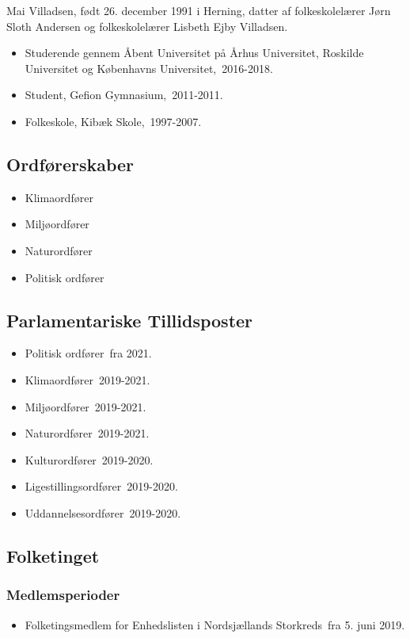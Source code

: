 \documentclass[11pt, a4paper]{awesome-cv}
\begin{document}
\makecvheader[R]
\makelettertitle
\begin{cvletter}
Mai Villadsen, født 26. december 1991 i Herning, datter af folkeskolelærer Jørn Sloth Andersen og folkeskolelærer Lisbeth Ejby Villadsen.

\begin{itemize}
\item Studerende gennem Åbent Universitet på Århus Universitet, Roskilde Universitet og Københavns Universitet, 2016-2018.
\item Student, Gefion Gymnasium, 2011-2011.
\item Folkeskole, Kibæk Skole, 1997-2007.
\end{itemize}
\subsection*{Ordførerskaber}
\begin{itemize}
\item Klimaordfører
\item Miljøordfører
\item Naturordfører
\item Politisk ordfører
\end{itemize}
\subsection*{Parlamentariske Tillidsposter}
\begin{itemize}
\item Politisk ordfører fra 2021.
\item Klimaordfører 2019-2021.
\item Miljøordfører 2019-2021.
\item Naturordfører 2019-2021.
\item Kulturordfører 2019-2020.
\item Ligestillingsordfører 2019-2020.
\item Uddannelsesordfører 2019-2020.
\end{itemize}
\subsection*{Folketinget}
\subsubsection*{Medlemsperioder}
\begin{itemize}
\item Folketingsmedlem for Enhedslisten i Nordsjællands Storkreds fra 5. juni 2019.
\end{itemize}

\end{cvletter}
\end{document}
